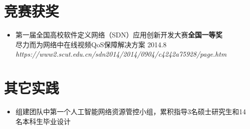 \documentclass{resume}
\begin{document}
\section{竞赛获奖}
\begin{itemize}[parsep=0.2ex]
  \item 第一届全国高校软件定义网络（SDN）应用创新开发大赛\textbf{全国一等奖}
  \\尽力而为网络中在线视频QoS保障解决方案 2014.8\\ \textit{https://www2.scut.edu.cn/sdn2014/2014/0904/c4242a75928/page.htm}
\end{itemize}


\section{ 其它实践}
\begin{itemize}[parsep=0.2ex]
    \item 组建团队中第一个人工智能网络资源管控小组，累积指导3名硕士研究生和14名本科生毕业设计
\end{itemize}

%
%
\end{document}
